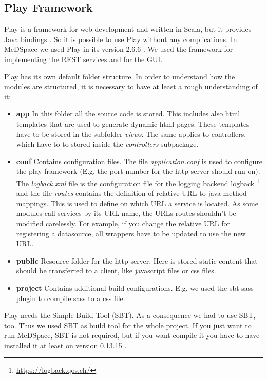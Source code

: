 \subsection{Play Framework}

Play is a framework for web development and written in Scala, but it provides Java bindings \cite{Play}. So it is possible to use Play without any complications. In MeDSpace we used Play in its version 2.6.6 . We used the framework for implementing the REST services and for the GUI. 

Play has its own default folder structure. In order to understand how the modules are structured, it is necessary to have at least a rough understanding of it:

\begin{itemize}
\item \textbf{app} In this folder all the source code is stored. This includes also html templates that are used to generate dynamic html pages. These templates have to be stored in the subfolder  \emph{views}. The same applies to controllers, which have to to stored inside the \emph{controllers} subpackage.

\item \textbf{conf} Contains configuration files. The  file \emph{application.conf} is used to configure the play framework (E.g. the port number for the http server should run on). The \emph{logback.xml} file is the configuration file for the logging backend logback \footnote{\url{https://logback.qos.ch/}} and the file \emph{routes} contains the definition of relative URL to java method mappings. This is used to define on which URL a service is located. As some modules call services by its URL name, the URLs routes shouldn't be modified carelessly. For example, if you change the relative URL for registering a datasource, all wrappers have to be updated to use the new URL.

\item \textbf{public} Resource folder for the http server. Here is stored static content that should be transferred to a client, like javascript files or css files.

\item \textbf{project} Contains additional build configurations. E.g. we used the sbt-sass plugin to compile sass to a css file. 
\end{itemize} 

Play needs the Simple Build Tool \cite{SBT}(SBT). As a consequence we had to use SBT, too. Thus we used SBT as build tool for the whole project. If you just want to run MeDSpace, SBT is not required, but if you want compile it you have to have installed it at least on version 0.13.15 . 

